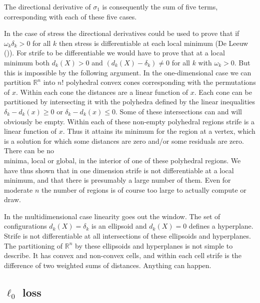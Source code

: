 \documentclass[
  12pt,
  letterpaper,
  DIV=11,
  numbers=noendperiod]{scrartcl}
\theoremstyle{definition}
\theoremstyle{plain}
\theoremstyle{plain}
\theoremstyle{remark}
\begin{document}
The directional derivative of \(\sigma_1\) is consequently the sum of
five terms, corresponding with each of these five cases.

In the case of stress the directional derivatives could be used to prove
that if \(\omega_k\delta_k>0\) for all \(k\) then stress is
differentiable at each local minimum (De Leeuw
()). For strife to be differentiable
we would have to prove that at a local minimum both \(d_k(X)>0\) and
\((d_k(X)-\delta_k)\not= 0\) for all \(k\) with \(\omega_k>0\). But this
is impossible by the following argument. In the one-dimensional case we
can partition \(\mathbb{R}^n\) into \(n!\) polyhedral convex cones
corresponding with the permutations of \(x\). Within each cone the
distances are a linear function of \(x\). Each cone can be partitioned
by intersecting it with the polyhedra defined by the linear inequalities
\(\delta_k-d_k(x)\geq 0\) or \(\delta_k-d_k(x)\leq 0\). Some of these
intersections can and will obviously be empty. Within each of these
non-empty polyhedral regions strife is a linear function of \(x\). Thus
it attains its minimum for the region at a vertex, which is a solution
for which some distances are zero and/or some residuals are zero. There
can be no\\
minima, local or global, in the interior of one of these polyhedral
regions. We have thus shown that in one dimension strife is not
differentiable at a local minimum, and that there is presumably a large
number of them. Even for moderate \(n\) the number of regions is of
course too large to actually compute or draw.

In the multidimensional case linearity goes out the window. The set of
configurations \(d_k(X)=\delta_k\) is an ellipsoid and \(d_k(X)=0\)
defines a hyperplane. Strife is not differentiable at all intersections
of these ellipsoids and hyperplanes. The partitioning of
\(\mathbb{R}^n\) by these ellipsoids and hyperplanes is not simple to
describe. It has convex and non-convex cells, and within each cell
strife is the difference of two weighted sums of distances. Anything can
happen.

\subsection{\texorpdfstring{\(\ell_0\)
loss}{\textbackslash ell\_0 loss}}\label{ell_0-loss}
\end{document}
